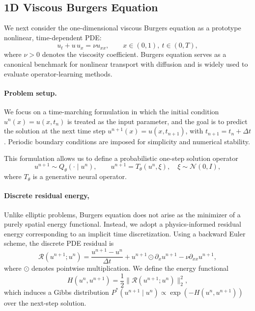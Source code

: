 \documentclass[11pt]{article}
\begin{document}
\subsection{1D Viscous Burgers Equation}
\label{sec:burgers}

We next consider the one-dimensional viscous Burgers equation as a prototype nonlinear, time-dependent PDE:
\begin{equation}
    u_t + u\,u_x = \nu u_{xx},
    \qquad x \in (0,1),\ t \in (0,T),
    \label{eq:burgers_pde}
\end{equation}
where \(\nu > 0\) denotes the viscosity coefficient. Burgers equation serves as a canonical benchmark for nonlinear transport with diffusion and is widely used to evaluate operator-learning methods.
\paragraph{Problem setup.} We focus on a time-marching formulation in which the initial condition
\(
u^n(x) = u(x, t_n)
\)
is treated as the input parameter, and the goal is to predict the solution at the next time step \(u^{n+1}(x) = u(x, t_{n+1})\), with \(t_{n+1} = t_n + \Delta t\).
Periodic boundary conditions are imposed for simplicity and numerical stability.

This formulation allows us to define a probabilistic one-step solution operator
\[
u^{n+1} \sim Q_\theta(\cdot \mid u^n),
\qquad
u^{n+1} = T_\theta(u^n, \xi),
\quad \xi \sim \mathcal{N}(0, I),
\]
where \(T_\theta\) is a generative neural operator.

\paragraph{Discrete residual energy,}
Unlike elliptic problems, Burgers equation does not arise as the minimizer of a purely spatial energy functional. Instead, we adopt a physics-informed residual energy corresponding to an implicit time discretization. Using a backward Euler scheme, the discrete PDE residual is
\begin{equation}
    \mathcal{R}(u^{n+1}; u^n)
    =
    \frac{u^{n+1} - u^n}{\Delta t}
    +
    u^{n+1} \odot \partial_x u^{n+1}
    -
    \nu \partial_{xx} u^{n+1},
    \label{eq:burgers_residual}
\end{equation}
where \(\odot\) denotes pointwise multiplication. We define the energy functional
\begin{equation}
    H(u^n, u^{n+1})
    =
    \frac{1}{2}
    \big\|
        \mathcal{R}(u^{n+1}; u^n)
    \big\|_2^2,
    \label{eq:burgers_energy}
\end{equation}
which induces a Gibbs distribution
\(
P^*(u^{n+1} \mid u^n) \propto \exp(-H(u^n, u^{n+1}))
\)
over the next-step solution.
\end{document}
